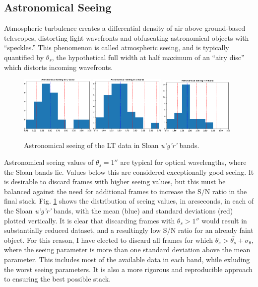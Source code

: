\documentclass[a4paper,11pt]{article}
\begin{document}
\subsection{Astronomical Seeing}\label{sec:astronomical_seeing}

Atmospheric turbulence creates a differential density of air above ground-based telescopes, distorting light wavefronts and obfuscating astronomical objects with ``speckles.'' This phenomenon is called atmospheric seeing, and is typically quantified by $\theta_s$, the hypothetical full width at half maximum of an ``airy disc'' which distorts incoming wavefronts.

\begin{figure}[h!]
    \includegraphics[width=0.32\textwidth]{seeing_hist_U_band.eps}
    \includegraphics[width=0.32\textwidth]{seeing_hist_G_band.eps}
    \includegraphics[width=0.32\textwidth]{seeing_hist_R_band.eps}
    \caption{Astronomical seeing of the LT data in Sloan \textit{u'g'r'} bands.}
    \label{fig:seeing}
\end{figure}

Astronomical seeing values of $\theta_s=1''$ are typical for optical wavelengths, where the Sloan bands lie. Values below this are considered exceptionally good seeing.\cite{mcclure_2019}\cite{lawrence_2014} It is desirable to discard frames with higher seeing values, but this must be balanced against the need for additional frames to increase the S/N ratio in the final stack. Fig. \ref{fig:seeing} shows the distribution of seeing values, in arcseconds, in each of the Sloan \textit{u'g'r'} bands, with the mean (blue) and standard deviations (red) plotted vertically. It is clear that discarding frames with $\theta_s>1''$ would result in substantially reduced dataset, and a resultingly low S/N ratio for an already faint object. For this reason, I have elected to discard all frames for which $\theta_s>\bar{\theta_s}+\sigma_\theta$, where the seeing parameter is more than one standard deviation above the mean parameter. This includes most of the available data in each band, while exluding the worst seeing parameters. It is also a more rigorous and reproducible approach to ensuring the best possible stack.
\end{document}
